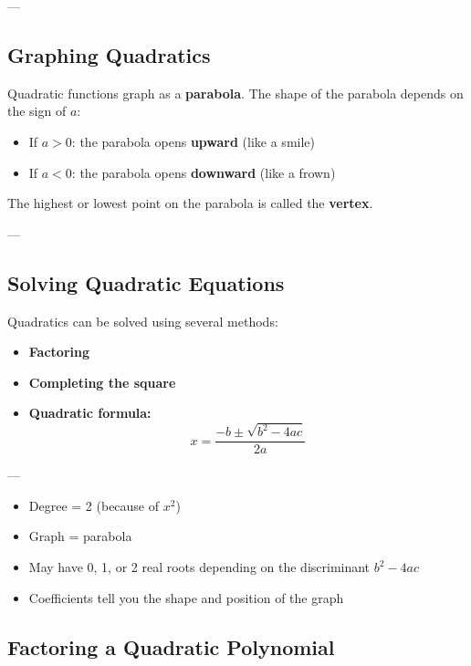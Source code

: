 \documentclass[11pt]{article}
\begin{document}
---

\subsection*{Graphing Quadratics}

Quadratic functions graph as a \textbf{parabola}. The shape of the parabola depends on the sign of \( a \):
\begin{itemize}
  \item If \( a > 0 \): the parabola opens \textbf{upward} (like a smile)
  \item If \( a < 0 \): the parabola opens \textbf{downward} (like a frown)
\end{itemize}

The highest or lowest point on the parabola is called the \textbf{vertex}.

---

\subsection*{Solving Quadratic Equations}

Quadratics can be solved using several methods:
\begin{itemize}
  \item \textbf{Factoring}
  \item \textbf{Completing the square}
  \item \textbf{Quadratic formula:}
  \[
  x = \frac{-b \pm \sqrt{b^2 - 4ac}}{2a}
  \]
\end{itemize}

---

\begin{tcolorbox}[title=Quick Facts About Quadratics, colback=yellow!5!white, colframe=yellow!80!black]
\begin{itemize}
  \item Degree = 2 (because of \( x^2 \))
  \item Graph = parabola
  \item May have 0, 1, or 2 real roots depending on the discriminant \( b^2 - 4ac \)
  \item Coefficients tell you the shape and position of the graph
\end{itemize}
\end{tcolorbox}
\subsection{Factoring a Quadratic Polynomial}
\end{document}
